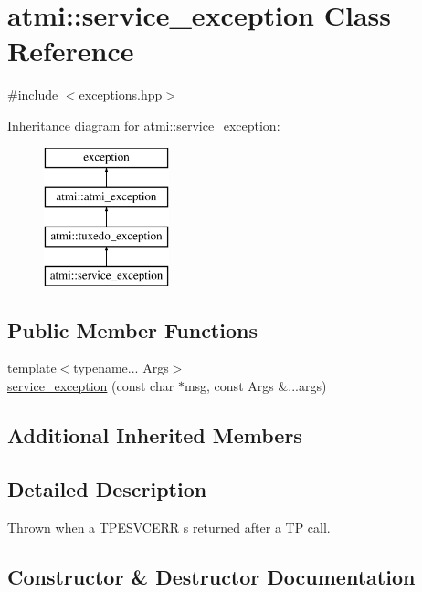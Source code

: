 \hypertarget{classatmi_1_1service__exception}{}\section{atmi\+:\+:service\+\_\+exception Class Reference}
\label{classatmi_1_1service__exception}


{\ttfamily \#include $<$exceptions.\+hpp$>$}

Inheritance diagram for atmi\+:\+:service\+\_\+exception\+:\begin{figure}[H]
\begin{center}
\leavevmode
\includegraphics[height=4.000000cm]{classatmi_1_1service__exception}
\end{center}
\end{figure}
\subsection*{Public Member Functions}
\begin{DoxyCompactItemize}
\item 
{\footnotesize template$<$typename... Args$>$ }\\\hyperlink{classatmi_1_1service__exception_aaaf22082b56169c161573ec3dfd4a6fd}{service\+\_\+exception} (const char $\ast$msg, const Args \&...args)
\end{DoxyCompactItemize}
\subsection*{Additional Inherited Members}


\subsection{Detailed Description}
Thrown when a T\+P\+E\+S\+V\+C\+E\+R\+R s returned after a T\+P call. 

\subsection{Constructor \& Destructor Documentation}
\hypertarget{classatmi_1_1service__exception_aaaf22082b56169c161573ec3dfd4a6fd}{}
